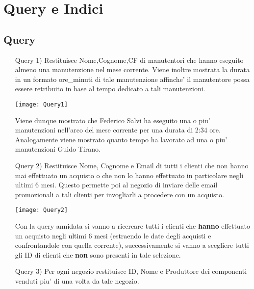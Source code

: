 \section{Query e Indici}

\subsection{Query}
\begin{enumerate}
\item[Query 1)] Restituisce Nome,Cognome,CF di manutentori che hanno eseguito almeno una manutenzione nel mese corrente. Viene inoltre mostrata la durata in un formato ore\_minuti di tale manutenzione affinche' il manutentore possa essere retribuito in base al tempo dedicato a tali manutenzioni.\\



\begin{center}
\texttt{[image: Query1]}
\end{center}

Viene dunque mostrato che Federico Salvi ha eseguito una o piu' manutenzioni nell'arco del mese corrente per una durata di 2:34 ore. Analogamente viene mostrato quanto tempo ha lavorato ad una o piu' manutenzioni Guido Tirano.\\

\item[Query 2)] Restituisce Nome, Cognome e Email di tutti i clienti che non hanno mai effettuato un acquisto o che non lo hanno effettuato in particolare negli ultimi 6 mesi. Questo permette poi al negozio di inviare delle email promozionali a tali clienti per invogliarli a procedere con un acquisto.\\



\begin{center}
\texttt{[image: Query2]}
\end{center}

Con la query annidata si vanno a ricercare tutti i clienti che \textbf{hanno} effettuato un acquisto negli ultimi 6 mesi (estraendo le date degli acquisti e confrontandole con quella corrente), successivamente si vanno a scegliere tutti gli ID di clienti che \textbf{non} sono presenti in tale selezione.\\

\item[Query 3)]Per ogni negozio restituisce ID, Nome e Produttore dei componenti venduti piu' di una volta da tale negozio.\\


\end{enumerate}
